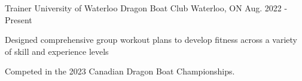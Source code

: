 

\begin{cventries}

  \cventry
    {Trainer} %
    {University of Waterloo Dragon Boat Club} %
    {Waterloo, ON} %
    {Aug. 2022 - Present} %
    {
      \begin{cvitems} %
        \item {Designed comprehensive group workout plans to develop fitness across a variety of skill and experience levels}
        \item {Competed in the 2023 Canadian Dragon Boat Championships.}
      \end{cvitems}
    }

\end{cventries}
